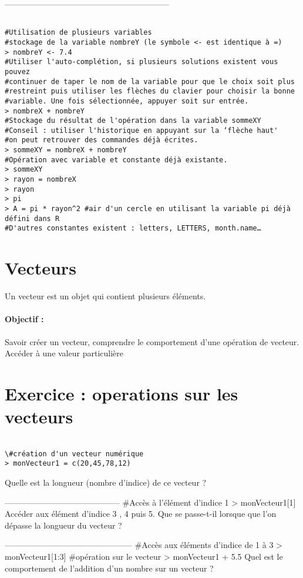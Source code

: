 \documentclass[a4paper]{article}
\begin{document}
------------------------------------------------------------
\begin{verbatim}

#Utilisation de plusieurs variables
#stockage de la variable nombreY (le symbole <- est identique à =)
> nombreY <- 7.4
#Utiliser l'auto-complétion, si plusieurs solutions existent vous pouvez  
#continuer de taper le nom de la variable pour que le choix soit plus 
#restreint puis utiliser les flèches du clavier pour choisir la bonne 
#variable. Une fois sélectionnée, appuyer soit sur entrée.
> nombreX + nombreY
#Stockage du résultat de l'opération dans la variable sommeXY
#Conseil : utiliser l'historique en appuyant sur la ‘flèche haut'
#on peut retrouver des commandes déjà écrites.		
> sommeXY = nombreX + nombreY		
#Opération avec variable et constante déjà existante.
> sommeXY					
> rayon = nombreX
> rayon
> pi
> A = pi * rayon^2 #air d'un cercle en utilisant la variable pi déjà défini dans R
#D'autres constantes existent : letters, LETTERS, month.name…

\end{verbatim}

\section{Vecteurs}
Un vecteur est un objet qui contient plusieurs éléments.
\paragraph{Objectif : }Savoir créer un vecteur,  comprendre le comportement d'une opération de vecteur. Accéder à une valeur particulière

\section{Exercice : operations sur les vecteurs}
\begin{verbatim}

\#création d'un vecteur numérique
> monVecteur1 = c(20,45,78,12)	
\end{verbatim}
Quelle est la longueur (nombre d'indice) de ce vecteur ? 

------------------------------------------
\#Accès à l'élément d'indice 1
> monVecteur1[1]				
Accéder aux élément d'indice  3 , 4 puis 5.
Que se passe-t-il lorsque que l'on dépasse la longueur du vecteur ?

-----------------------------------------------
\#Accès aux éléments d'indice de 1 à 3
> monVecteur1[1:3]			
\#opération sur le vecteur 
> monVecteur1 + 5.5			
Quel est le comportement de l'addition d'un nombre sur un vecteur ?
\end{document}
